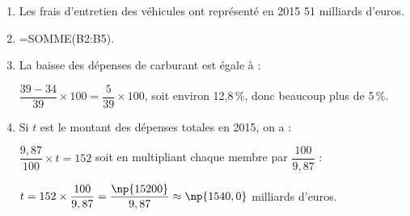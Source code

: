 \documentclass[10pt]{article}
\begin{document}
\begin{enumerate}
\item %
Les frais d'entretien des véhicules ont représenté en 2015 51 milliards d'euros.
\item %
=SOMME(B2:B5).
\item %
La baisse des dépenses de carburant est égale à :

$\dfrac{39 - 34}{39} \times 100 = \dfrac{5}{39}\times 100$, soit environ 12,8\,\%, donc beaucoup plus de 5\,\%.
\item %

Si $t$ est le montant des dépenses totales en 2015, on a :

$\dfrac{9,87}{100} \times t = 152$ soit en multipliant chaque membre par $\dfrac{100}{9,87}$ :

$t = 152 \times \dfrac{100}{9,87} = \dfrac{\np{15200}}{9,87}\approx \np{1540,0}$ milliards d'euros.
\end{enumerate}

\vspace{0,5cm}
\end{document}
